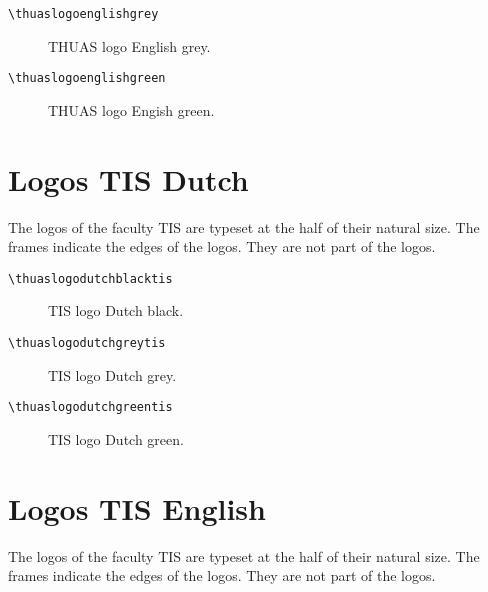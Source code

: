\documentclass[a4paper,12pt]{article}
\begin{document}
\begin{verbatim}
\thuaslogoenglishgrey
\end{verbatim}

\begin{figure}[H]
\centering\fboxsep=0pt%
\fbox{%
\thuaslogoenglishgrey}
\caption{THUAS logo English grey.}
\end{figure}

\begin{verbatim}
\thuaslogoenglishgreen
\end{verbatim}

\begin{figure}[H]
\centering\fboxsep=0pt%
\fbox{%
\thuaslogoenglishgreen}
\caption{THUAS logo Engish green.}
\end{figure}


\section{Logos TIS Dutch}
The logos of the faculty TIS are typeset at the half of their natural size.
The frames indicate the edges of the logos. They are not part of the logos.

\begin{verbatim}
\thuaslogodutchblacktis
\end{verbatim}

\begin{figure}[H]
\centering\fboxsep=0pt%
\fbox{%
\scalebox{0.7071}{\thuaslogodutchblacktis}}
\caption{TIS logo Dutch black.}
\end{figure}

\begin{verbatim}
\thuaslogodutchgreytis
\end{verbatim}

\begin{figure}[H]
\centering\fboxsep=0pt%
\fbox{%
\scalebox{0.7071}{\thuaslogodutchgreytis}}
\caption{TIS logo Dutch grey.}
\end{figure}

\begin{verbatim}
\thuaslogodutchgreentis
\end{verbatim}

\begin{figure}[H]
\centering\fboxsep=0pt%
\fbox{%
\scalebox{0.7071}{\thuaslogodutchgreentis}}
\caption{TIS logo Dutch green.}
\end{figure}


\section{Logos TIS English}
The logos of the faculty TIS are typeset at the half of their natural size.
The frames indicate the edges of the logos. They are not part of the logos.
\end{document}

